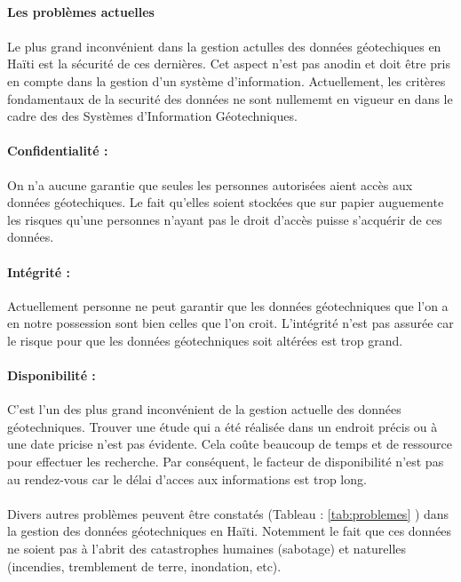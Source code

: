 \paragraph{Les problèmes actuelles}
\paragraph{}
Le plus grand inconvénient dans la gestion actulles des données géotechiques
en Haïti est la sécurité de ces dernières. 
Cet aspect n'est pas anodin et doit être pris en compte dans la gestion d'un système
d'information.
Actuellement, les critères fondamentaux de la securité des données ne sont nullememt en vigueur en dans le cadre des 
des Systèmes d'Information Géotechniques.
\paragraph{Confidentialité : }
On n'a aucune garantie que seules les personnes autorisées 
aient accès aux données géotechiques. Le fait qu'elles soient
stockées que sur papier auguemente les risques qu'une personnes
n'ayant pas le droit d'accès puisse s'acquérir de ces données.
\paragraph{Intégrité : }
Actuellement personne ne peut
garantir que les données géotechniques que l'on a en notre possession 
sont bien celles que l’on croit. L'intégrité n'est pas assurée car le risque
pour que les données géotechniques soit altérées est trop grand.
\paragraph{Disponibilité :}
C'est l'un des plus grand inconvénient de la gestion actuelle des 
données géotechniques. Trouver une étude qui a été réalisée dans un endroit précis
ou à une date pricise n'est pas évidente. Cela coûte beaucoup de temps et de ressource pour effectuer
les recherche. Par conséquent, le facteur de disponibilité n'est pas 
au rendez-vous car le délai d'acces aux informations est trop long.

\paragraph{}
Divers autres problèmes peuvent être constatés (Tableau : \ref{tab:problemes} )  dans la gestion
des données géotechniques en Haïti. Notemment le fait que ces données
ne soient pas à l'abrit des catastrophes humaines (sabotage) et naturelles
(incendies, tremblement de terre, inondation, etc).


